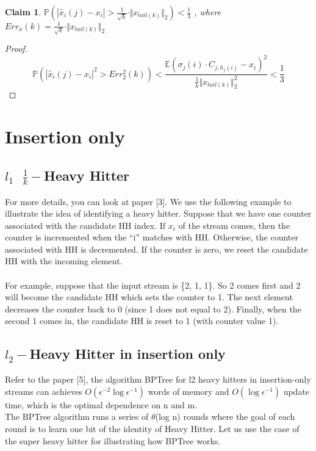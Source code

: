 \documentclass[11pt]{article}
\newtheorem{claim}[theorem]{Claim}
\begin{document}
\begin{claim}
$\mathbb{P}(|\tilde{x_i}(j)-x_i| > \frac{1}{\sqrt{k}}\cdot\Vert x_{tail(k)}\Vert_2)< \frac{1}{3}$ , where $Err_x(k) = \frac{1}{\sqrt{k}}\cdot\Vert x_{tail(k)}\Vert_2$
\end{claim}

\begin{proof}
\text{ }\\
\[ \mathbb{P}(|\tilde{x_i}(j)-x_i|^2 > Err_2^2(k)) < \frac{\mathbb{E}(\sigma_j(i) \cdot C_{j, h_j(i)} - x_i)^2}{\frac{1}{k}\Vert x_{tail(k)}\Vert_2^2} < \frac{1}{3} \]

\end{proof}

\section{Insertion only}
\subsection*{$l_1 \text{ } \frac{1}{k}-$Heavy Hitter}
For more details, you can look at paper [3].  We use the following example to illustrate the idea of identifying a heavy hitter.  Suppose that we have one counter associated with the candidate HH index.  If $x_i$ of the stream comes, then the counter is incremented when the “i” matches with HH.  Otherwise, the counter associated with HH is decremented. If the counter is zero, we reset the candidate HH with the incoming element. \\
\text{ }\\
For example, suppose that the input stream is \{2, 1, 1\}.  So 2 comes first and 2 will become the candidate HH which sets the counter to 1.  The next element decreases the counter back to 0 (since 1 does not equal to 2). Finally, when the second 1 comes in, the candidate HH is reset to 1 (with counter value 1).

\subsection*{$l_2-$Heavy Hitter in insertion only}
Refer to the paper [5], the algorithm BPTree for l2 heavy hitters in insertion-only streams can achieves $O(\epsilon^{-2}\log\epsilon^{-1})$ words of memory and $O(\log\epsilon^{-1})$ update time, which is the optimal dependence on n and m.\\

The BPTree algorithm runs a series of $\theta$(log n) rounds where the goal of each round is to learn one bit of the identity of Heavy Hitter. Let us use the case of the super heavy hitter for illustrating how BPTree works.  \\
\end{document}
